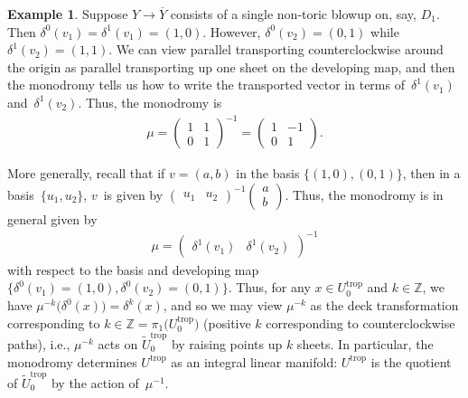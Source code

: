 \documentclass[pdftex]{sigma}
\numberwithin{equation}{section}
\numberwithin{figure}{section}
\numberwithin{table}{section}
\DeclareMathOperator{\trop}{trop}
\let\?=\overline
\let\bb=\mathbb
\let\rar=\rightarrow
\let\wt=\widetilde
\theoremstyle{definition}
\newtheorem{eg}[thm]{Example}
\begin{document}
\begin{eg} \label{focusfocus}Suppose $Y\rar \?{Y}$ consists of a single non-toric blowup on, say, $D_1$. Then $\delta^0(v_1)=\delta^1(v_1)=(1,0)$. However, $\delta^0(v_2) = (0,1)$ while $\delta^1(v_2) = (1,1)$. We can view parallel transporting counterclockwise around the origin as parallel transporting up one sheet on the developing map, and then the monodromy tells us how to write the transported vector in terms of~$\delta^1(v_1)$ and~$\delta^1(v_2)$. Thus, the monodromy is
\begin{gather*}
	\mu=\left(\begin{matrix}
		1 &1 \\
		0 &1
		\end{matrix}\right)^{-1}
	=	\left(\begin{matrix}
		1 &-1 \\
		0 &1
		\end{matrix}\right).	
\end{gather*}
\end{eg}

More generally, recall that if $v=(a,b)$ in the basis $\{(1,0), (0,1)\}$, then in a basis~$\{u_1,u_2\}$, $v$~is given by $\left(\begin{smallmatrix} u_1 & u_2 \end{smallmatrix} \right)^{-1}\left(\begin{smallmatrix} a \\ b \end{smallmatrix} \right)$. Thus, the monodromy is in general given by
\begin{gather*}
 \mu=\left(\begin{matrix}\delta^1(v_{1}) & \delta^1(v_{2}) \end{matrix} \right)^{-1}
\end{gather*} with respect to the basis and developing map $\big\{\delta^0(v_{1})=(1,0),\delta^0(v_{2})=(0,1)\big\}$. Thus, for any \mbox{$x\in U^{\trop}_0$} and $k\in \bb{Z}$, we have $\mu^{-k}\big(\delta^0(x)\big)=\delta^k(x)$, and so we may view $\mu^{-k}$ as the deck transformation corresponding to $k\in \bb{Z}=\pi_1\big(U^{\trop}_0\big)$ (positive $k$ corresponding to counterclockwise paths), i.e., $\mu^{-k}$ acts on $\wt{U}_0^{\trop}$ by raising points up $k$ sheets. In particular, the monodromy determines $U^{\trop}$ as an integral linear manifold: $U^{\trop}$ is the quotient of $\wt{U}_0^{\trop}$ by the action of~$\mu^{-1}$.
\end{document}

